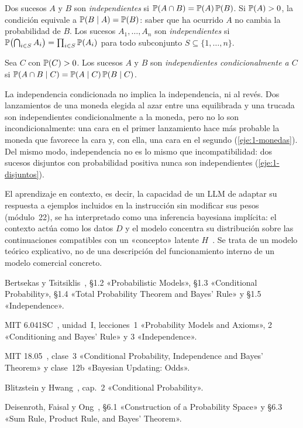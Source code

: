 \begin{definicion}[Independencia]\label{def:indep}
Dos sucesos $A$ y $B$ son \emph{independientes} si $\mathbb{P}(A\cap B)=\mathbb{P}(A)\,\mathbb{P}(B)$. Si $\mathbb{P}(A)>0$, la condición equivale a $\mathbb{P}(B\mid A)=\mathbb{P}(B)$: saber que ha ocurrido $A$ no cambia la probabilidad de $B$. Los sucesos $A_1,\dots,A_n$ son \emph{independientes} si $\mathbb{P}\bigl(\bigcap_{i\in S}A_i\bigr)=\prod_{i\in S}\mathbb{P}(A_i)$ para todo subconjunto $S\subseteq\{1,\dots,n\}$.
\end{definicion}

\begin{definicion}
Sea $C$ con $\mathbb{P}(C)>0$. Los sucesos $A$ y $B$ son \emph{independientes condicionalmente a $C$} si $\mathbb{P}(A\cap B\mid C)=\mathbb{P}(A\mid C)\,\mathbb{P}(B\mid C)$.
\end{definicion}

\begin{observacion}
La independencia condicionada no implica la independencia, ni al revés. Dos lanzamientos de una moneda elegida al azar entre una equilibrada y una trucada son independientes condicionalmente a la moneda, pero no lo son incondicionalmente: una cara en el primer lanzamiento hace más probable la moneda que favorece la cara y, con ella, una cara en el segundo (\cref{eje:1-monedas}). Del mismo modo, independencia no es lo mismo que incompatibilidad: dos sucesos disjuntos con probabilidad positiva nunca son independientes (\cref{eje:1-disjuntos}).
\end{observacion}

\begin{observacion}
El aprendizaje en contexto, es decir, la capacidad de un LLM de adaptar su respuesta a ejemplos incluidos en la instrucción sin modificar sus pesos (módulo~22), se ha interpretado como una inferencia bayesiana implícita: el contexto actúa como los datos $D$ y el modelo concentra su distribución sobre las continuaciones compatibles con un «concepto» latente $H$~\cite{xie}. Se trata de un modelo teórico explicativo, no de una descripción del funcionamiento interno de un modelo comercial concreto.
\end{observacion}

\begin{lecturas}
\item Bertsekas y Tsitsiklis~\cite{bt}, §1.2 «Probabilistic Models», §1.3 «Conditional Probability», §1.4 «Total Probability Theorem and Bayes' Rule» y §1.5 «Independence».
\item MIT 6.041SC~\cite{mit6041}, unidad~I, lecciones~1 «Probability Models and Axioms», 2 «Conditioning and Bayes' Rule» y 3 «Independence».
\item MIT 18.05~\cite{mit1805}, clase~3 «Conditional Probability, Independence and Bayes' Theorem» y clase~12b «Bayesian Updating: Odds».
\item Blitzstein y Hwang~\cite{bh}, cap.~2 «Conditional Probability».
\item Deisenroth, Faisal y Ong~\cite{mml}, §6.1 «Construction of a Probability Space» y §6.3 «Sum Rule, Product Rule, and Bayes' Theorem».
\end{lecturas}

